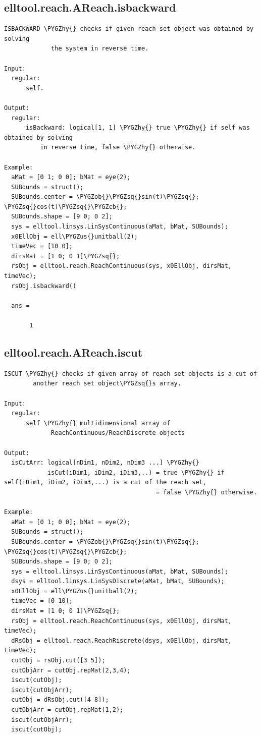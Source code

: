 \documentclass[letterpaper,10pt,english]{sphinxmanual}
\def\PYGZus{\char`\_}
\def\PYGZob{\char`\{}
\def\PYGZcb{\char`\}}
\def\PYGZhy{\char`\-}
\def\PYGZsq{\char`\'}
\begin{document}
\subsection{elltool.reach.AReach.isbackward}
\label{chap_functions:elltool-reach-areach-isbackward}
\begin{Verbatim}[commandchars=\\\{\}]
ISBACKWARD \PYGZhy{} checks if given reach set object was obtained by solving
             the system in reverse time.

Input:
  regular:
      self.

Output:
  regular:
      isBackward: logical[1, 1] \PYGZhy{} true \PYGZhy{} if self was obtained by solving
          in reverse time, false \PYGZhy{} otherwise.

Example:
  aMat = [0 1; 0 0]; bMat = eye(2);
  SUBounds = struct();
  SUBounds.center = \PYGZob{}\PYGZsq{}sin(t)\PYGZsq{}; \PYGZsq{}cos(t)\PYGZsq{}\PYGZcb{};
  SUBounds.shape = [9 0; 0 2];
  sys = elltool.linsys.LinSysContinuous(aMat, bMat, SUBounds);
  x0EllObj = ell\PYGZus{}unitball(2);
  timeVec = [10 0];
  dirsMat = [1 0; 0 1]\PYGZsq{};
  rsObj = elltool.reach.ReachContinuous(sys, x0EllObj, dirsMat, timeVec);
  rsObj.isbackward()

  ans =

       1
\end{Verbatim}


\subsection{elltool.reach.AReach.iscut}
\label{chap_functions:elltool-reach-areach-iscut}
\begin{Verbatim}[commandchars=\\\{\}]
ISCUT \PYGZhy{} checks if given array of reach set objects is a cut of
        another reach set object\PYGZsq{}s array.

Input:
  regular:
      self \PYGZhy{} multidimensional array of
             ReachContinuous/ReachDiscrete objects

Output:
  isCutArr: logical[nDim1, nDim2, nDim3 ...] \PYGZhy{}
            isCut(iDim1, iDim2, iDim3,..) = true \PYGZhy{} if self(iDim1, iDim2, iDim3,...) is a cut of the reach set,
                                          = false \PYGZhy{} otherwise.

Example:
  aMat = [0 1; 0 0]; bMat = eye(2);
  SUBounds = struct();
  SUBounds.center = \PYGZob{}\PYGZsq{}sin(t)\PYGZsq{}; \PYGZsq{}cos(t)\PYGZsq{}\PYGZcb{};
  SUBounds.shape = [9 0; 0 2];
  sys = elltool.linsys.LinSysContinuous(aMat, bMat, SUBounds);
  dsys = elltool.linsys.LinSysDiscrete(aMat, bMat, SUBounds);
  x0EllObj = ell\PYGZus{}unitball(2);
  timeVec = [0 10];
  dirsMat = [1 0; 0 1]\PYGZsq{};
  rsObj = elltool.reach.ReachContinuous(sys, x0EllObj, dirsMat, timeVec);
  dRsObj = elltool.reach.ReachRiscrete(dsys, x0EllObj, dirsMat, timeVec);
  cutObj = rsObj.cut([3 5]);
  cutObjArr = cutObj.repMat(2,3,4);
  iscut(cutObj);
  iscut(cutObjArr);
  cutObj = dRsObj.cut([4 8]);
  cutObjArr = cutObj.repMat(1,2);
  iscut(cutObjArr);
  iscut(cutObj);
\end{Verbatim}
\end{document}

